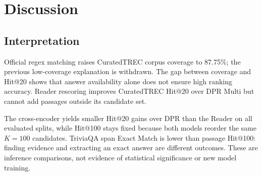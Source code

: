 \section{Discussion}
\subsection{Interpretation}
Official regex matching raises CuratedTREC corpus coverage to 87.75\%; the previous low-coverage explanation is withdrawn. The gap between coverage and Hit@20 shows that answer availability alone does not ensure high ranking accuracy. Reader rescoring improves CuratedTREC Hit@20 over DPR Multi but cannot add passages outside its candidate set.

The cross-encoder yields smaller Hit@20 gains over DPR than the Reader on all evaluated splits, while Hit@100 stays fixed because both models reorder the same $K=100$ candidates. TriviaQA span Exact Match is lower than passage Hit@100: finding evidence and extracting an exact answer are different outcomes. These are inference comparisons, not evidence of statistical significance or new model training.
